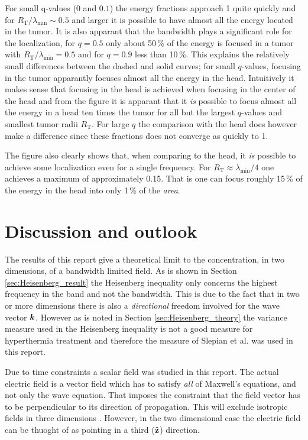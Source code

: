 \documentclass[11pt,a4paper, 
swedish,english %
]{article}
\newcommand{\RT}{\ensuremath{R_{\text{T}}}}
\begin{document}
For small q-values ($0$ and $0.1$) the energy fractions approach 1
quite quickly and for $\RT/\lambda_{\min} \sim 0.5$ and larger it is
possible to have almost all the energy located in the tumor. It is
also apparant that the bandwidth plays a significant role for the
localization, for $q=0.5$ only about 50\,\% of the energy is focused
in a tumor with $\RT/\lambda_{\min}=0.5$ and for $q=0.9$ less than
10\,\%. 
This explains the relatively small differences between the dashed and
solid curves; for small $q$-values, focusing in the tumor apparantly
focuses almost all the energy in the head. Intuitively it makes sense
that focusing in the head is achieved when focusing in the center of
the head and from the figure it is apparant that it \emph{is} possible
to focus almost all the energy in a head ten times the tumor for all
but the largest $q$-values and smallest tumor radii $\RT$. For large
$q$ the comparison with the head does however make a difference since
these fractions does not converge as quickly to 1.  

The figure also clearly shows that, when comparing to the head, it
\emph{is} possible to achieve some localization even for a single
frequency. For $\RT \approx \lambda_{\min}/4$ one achieves a maximum
of approximately 0.15. That is one can focus roughly 15\,\% of the
energy in the head into only 1\,\% of the \emph{area}. 



\section{Discussion and outlook}

The results of this report give a theoretical limit to the
concentration, in two dimensions, of a bandwidth limited field.
As is shown in Section \ref{sec:Heisenberg_result} the Heisenberg 
inequality only concerns the highest frequency in the band and not
the bandwidth. This is due to the fact that in two or more dimensions
there is also a \emph{directional} freedom involved for the wave 
vector $\vb*k$. However as is noted in Section \ref{sec:Heisenberg_theory}
the variance measure used in the Heisenberg inequality is not a 
good measure for hyperthermia treatment and therefore the measure of
Slepian et al. was used in this report.

Due to time constraints a scalar field was studied in this report.
The actual electric field is a vector field which has to satisfy
\emph{all} of Maxwell's equations, and not only the wave
equation. That imposes the constraint that the field vector has to be
perpendicular to its direction of propagation. This will exclude
isotropic fields in three dimensions \cite{Jackson}.
However, in the two dimensional case the electric field can be thuoght
of as pointing in a third ($\vu{z}$) direction.
\end{document}
